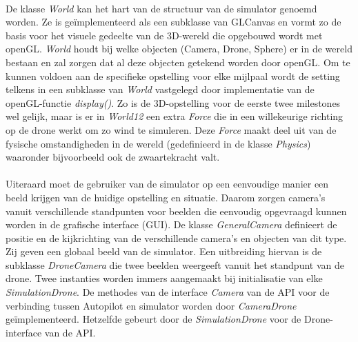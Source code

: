 \\



\noindent
De klasse \textit{World} kan het hart van de structuur van de simulator genoemd worden. Ze is ge\"implementeerd als een subklasse van GLCanvas en vormt zo de basis voor het visuele gedeelte van de 3D-wereld die opgebouwd wordt met openGL. \textit{World} houdt bij welke objecten (Camera, Drone, Sphere) er in de wereld bestaan en zal zorgen dat al deze objecten getekend worden door openGL. Om te kunnen voldoen aan de specifieke opstelling voor elke mijlpaal wordt de setting telkens in een subklasse van \textit{World} vastgelegd door implementatie van de openGL-functie \textit{display()}. Zo is de 3D-opstelling voor de eerste twee milestones wel gelijk, maar is er in \textit{World12} een extra \textit{Force} die in een willekeurige richting op de drone werkt om zo wind te simuleren. Deze \textit{Force} maakt deel uit van de fysische omstandigheden in de wereld (gedefinieerd in de klasse \textit{Physics}) waaronder bijvoorbeeld ook de zwaartekracht valt. \\
~\\
\noindent
Uiteraard moet de gebruiker van de simulator op een eenvoudige manier een beeld krijgen van de huidige opstelling en situatie. Daarom zorgen camera's vanuit verschillende standpunten voor beelden die eenvoudig opgevraagd kunnen worden in de grafische interface (GUI). De klasse \textit{GeneralCamera} definieert de positie en de kijkrichting van de verschillende camera's en objecten van dit type. Zij geven een globaal beeld van de simulator. Een uitbreiding hiervan is de subklasse \textit{DroneCamera} die twee beelden weergeeft vanuit het standpunt van de drone. Twee instanties worden immers aangemaakt bij initialisatie van elke \textit{SimulationDrone}. De methodes van de interface \textit{Camera} van de API voor de verbinding tussen Autopilot en simulator worden door \textit{CameraDrone} ge\"implementeerd. Hetzelfde gebeurt door de \textit{SimulationDrone} voor de Drone-interface van de API.